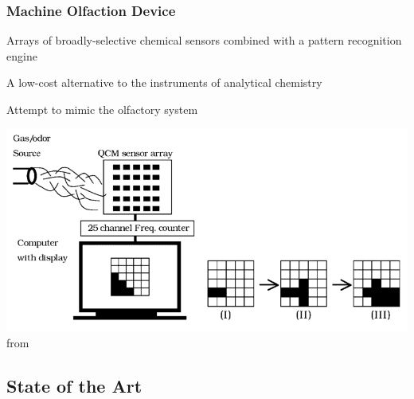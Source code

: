 \documentclass{beamer}
\newcommand{\mancite}[1]{{\scriptsize{\textbf{\color{MainGreen}{[#1] }}}}}
\begin{document}
\begin{frame}
\frametitle{Machine Olfaction Device}
\begin{description}[leftmargin=0cm]
  \item[Definition:] Arrays of broadly-selective chemical sensors combined with a pattern recognition engine
  \item[Technologically:] A low-cost alternative to the instruments of analytical chemistry
  \item[Conceptually:] Attempt to mimic the olfactory system

\begin{center}
\includegraphics[width=.9\linewidth]{images/array-measurements-handbook.png} \\
\tiny{from \mancite{Pearce et al., 2003}}
\end{center}
\end{description}

\end{frame}

\subsection{State of the Art}
\end{document}

